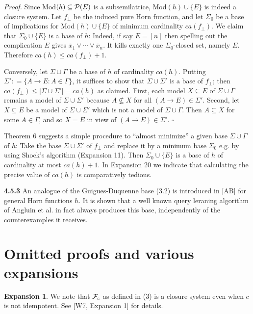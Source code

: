 \documentclass[11pt]{article}
\newcommand{\ol}{\overline}
\newcommand{\ra}{\rightarrow}
\begin{document}
{\it Proof.} Since Mod$(h) \subseteq {\cal P}(E)$ is a subsemilattice, Mod$(h) \cup \{E\}$ is indeed a closure system. Let $f_\bot$ be the induced pure Horn function, and let $\Sigma_0$ be a base of implications for Mod$(h) \cup \{E\}$ of minimum cardinality $ca(f_\bot)$. We claim that $\Sigma_0 \cup \{E\}$ is a base of $h$: Indeed, if say $E=[n]$ then spelling out the complication $E$ gives $\ol{x}_1 \vee \cdots \vee \ol{x}_n$. It kills exactly one $\Sigma_0$-closed set, namely $E$. Therefore $ca(h) \leq ca(f_\bot) +1$. 

Conversely, let $\Sigma \cup \Gamma$ be a base of $h$ of cardinality $ca(h)$. Putting $\Sigma' : = \{A \ra E: A \in \Gamma \}$, it suffices to show that $\Sigma \cup \Sigma'$ is a base of $f_\bot$;  then $ca(f_\bot) \leq |\Sigma \cup \Sigma'| = ca(h)$ as claimed. First, each model $X \subseteq E$ of $\Sigma \cup \Gamma$ remains a model of $\Sigma \cup \Sigma'$ because $A \not\subseteq X$ for all $(A \ra E) \in \Sigma'$. Second, let $X \subseteq E$ be a model of $\Sigma \cup \Sigma'$ which is not a model of $\Sigma \cup \Gamma$. Then $A \subseteq X$ for some $A \in \Gamma$, and so $X = E$ in view of $(A \ra E) \in \Sigma'$. \quad $\square$

Theorem 6 suggests a simple procedure to ``almost minimize'' a given base $\Sigma \cup \Gamma$ of $h$: Take the base $\Sigma \cup \Sigma'$ of $f_\bot$ and replace it by a minimum base $\Sigma_0$ e.g. by using Shock's algorithm (Expansion 11). Then $\Sigma_0 \cup \{E\}$ is a base of $h$ of cardinality at most $ca(h) +1$. 
In Expansion 20 we indicate that calculating the precise value of $ca(h)$ is comparatively tedious.


{\bf 4.5.3} An analogue of the Guigues-Duquenne base (3.2) is introduced in [AB] for general Horn functions $h$. It is shown that a well known query leraning algorithm of Angluin et al. in fact always produces this base, independently of the counterexamples it receives.



\section{Omitted proofs and various expansions}




{\bf Expansion 1}. We note that ${\cal F}_c$ as defined in (3) is a closure system even when $c$ is not idempotent. See [W7, Expansion 1] for details.
\end{document}
